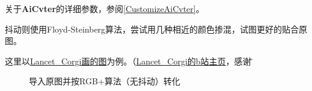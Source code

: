 \documentclass[UTF8]{ctexart}
\begin{document}
    关于\textbf{AiCvter}的详细参数，参阅\ref{CustomizeAiCvter}。
    
    抖动则使用Floyd-Steinberg算法，尝试用几种相近的颜色掺混，试图更好的贴合原图。
    
    这里以\href{https://t.bilibili.com/544583492149793294}{Lancet\_Corgi画的图}为例。（\href{https://space.bilibili.com/37171000}{Lancet\_Corgi的b站主页}，感谢\~）
    
    \begin{figure}[htbp]
        \centering
        \setcounter{subfigure}{0}
        \caption{导入原图并按RGB+算法（无抖动）转化}
    \end{figure}
    
\end{document}
